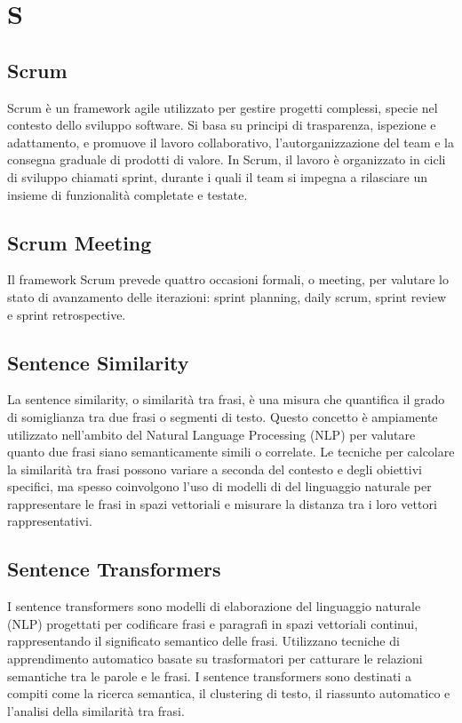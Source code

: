 \section{S}

\vspace{2em}
\subsection*{Scrum}
\par Scrum è un framework agile utilizzato per gestire progetti complessi, specie nel contesto dello sviluppo software. Si basa su principi di trasparenza, ispezione e adattamento, e promuove il lavoro collaborativo, l'autorganizzazione del team e la consegna graduale di prodotti di valore. In Scrum, il lavoro è organizzato in cicli di sviluppo chiamati sprint, durante i quali il team si impegna a rilasciare un insieme di funzionalità completate e testate.

\vspace{2em}
\subsection*{Scrum Meeting}
\par Il framework Scrum prevede quattro occasioni formali, o meeting, per valutare lo stato di avanzamento delle iterazioni: sprint planning, daily scrum, sprint review e sprint retrospective.

\vspace{2em}
\subsection*{Sentence Similarity}
\par La sentence similarity, o similarità tra frasi, è una misura che quantifica il grado di somiglianza tra due frasi o segmenti di testo. Questo concetto è ampiamente utilizzato nell'ambito del Natural Language Processing (NLP) per valutare quanto due frasi siano semanticamente simili o correlate. Le tecniche per calcolare la similarità tra frasi possono variare a seconda del contesto e degli obiettivi specifici, ma spesso coinvolgono l'uso di modelli di  del linguaggio naturale per rappresentare le frasi in spazi vettoriali e misurare la distanza tra i loro vettori rappresentativi.

\vspace{2em}
\subsection*{Sentence Transformers}
\par I sentence transformers sono modelli di elaborazione del linguaggio naturale (NLP) progettati per codificare frasi e paragrafi in spazi vettoriali continui, rappresentando il significato semantico delle frasi. Utilizzano tecniche di apprendimento automatico basate su trasformatori per catturare le relazioni semantiche tra le parole e le frasi. I sentence transformers sono destinati a compiti come la ricerca semantica, il clustering di testo, il riassunto automatico e l'analisi della similarità tra frasi.

